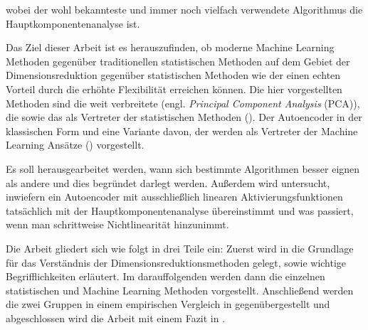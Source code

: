 wobei der wohl bekannteste und immer noch vielfach verwendete Algorithmus die
Hauptkomponentenanalyse ist. 

Das Ziel dieser Arbeit ist es herauszufinden, ob moderne Machine Learning Methoden gegenüber
traditionellen statistischen Methoden auf dem Gebiet der Dimensionsreduktion gegenüber
statistischen Methoden wie der einen echten Vorteil durch die erhöhte Flexibilität erreichen
können. Die hier vorgestellten Methoden sind die weit verbreitete 
(engl. \textit{Principal Component Analysis} (PCA)), die  sowie das
 als Vertreter der statistischen Methoden
(). Der Autoencoder in der klassischen Form und eine
Variante davon, der  werden als Vertreter der Machine Learning
Ansätze () vorgestellt.

Es soll herausgearbeitet werden, wann sich bestimmte Algorithmen besser eignen als andere und dies
begründet darlegt werden. Außerdem wird untersucht, inwiefern ein Autoencoder mit ausschließlich
linearen Aktivierungsfunktionen tatsächlich mit der Hauptkomponentenanalyse übereinstimmt und was
passiert, wenn man schrittweise Nichtlinearität hinzunimmt.

Die Arbeit gliedert sich wie folgt in drei Teile ein: Zuerst wird in
 die Grundlage für das Verständnis der Dimensionsreduktionsmethoden
gelegt, sowie wichtige Begrifflichkeiten erläutert. Im darauffolgenden
 werden dann die einzelnen statistischen und Machine Learning
Methoden vorgestellt. Anschließend werden die zwei Gruppen in einem empirischen Vergleich in
 gegenübergestellt und abgeschlossen wird die Arbeit mit einem Fazit in
.